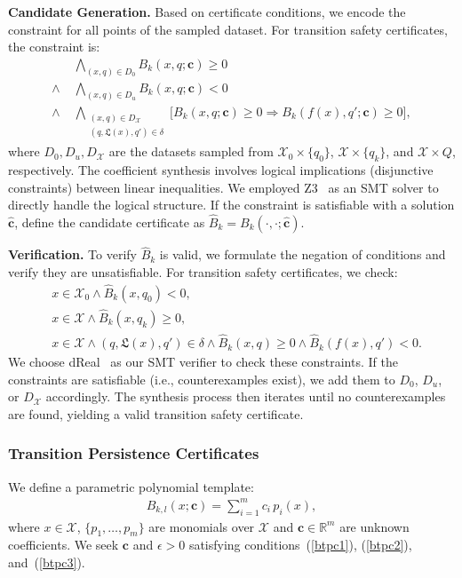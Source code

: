 \textbf{Candidate Generation.} Based on certificate conditions, we encode the constraint for all points of the sampled dataset.
For transition safety certificates, the constraint is:
\begin{align}
  &\bigwedge_{(x,q) \in D_0} B_k(x, q; \mathbf{c}) \geq 0 \label{smt:init} \\ 
  \wedge \; &\bigwedge_{(x,q) \in D_u} B_k(x, q; \mathbf{c}) < 0 \label{smt:unsafe} \\ 
  \wedge \; &\bigwedge_{\substack{(x,q) \in D_{\mathcal{X}} \\ (q, \mathfrak{L}(x), q') \in \delta}} \big[ B_k(x, q; \mathbf{c}) \geq 0 \Rightarrow B_k(f(x), q'; \mathbf{c}) \geq 0 \big], \label{smt:inv}
\end{align}
where $D_0, D_u, D_{\mathcal{X}}$ are the datasets sampled from $\mathcal{X}_0 \times \{q_0\}$, $\mathcal{X} \times \{q_k\}$, and $\mathcal{X} \times Q$, respectively. The coefficient synthesis involves logical implications (disjunctive constraints) between linear inequalities. We employed Z3~\cite{de2008z3} as an SMT solver to directly handle the logical structure. If the constraint is satisfiable with a solution $\hat{\mathbf{c}}$, define the candidate certificate as $\hat{B}_k = B_k(\cdot, \cdot; \hat{\mathbf{c}})$.

\textbf{Verification.} To verify $\hat{B}_k$ is valid, we formulate the negation of conditions and
verify they are unsatisfiable. For transition safety certificates, we check:
\begin{align}
  & x \in \mathcal{X}_0 \land \hat{B}_k(x, q_0) < 0, \label{smt:cex-init} \\ 
  & x \in \mathcal{X} \land \hat{B}_k(x, q_k) \geq 0, \label{smt:cex-unsafe}  \\ 
  & x \in \mathcal{X} \land (q, \mathfrak{L}(x), q') \in \delta \land \hat{B}_k(x, q) \geq 0 \land \hat{B}_k(f(x), q') < 0. \label{smt:cex-inv}
\end{align}
We choose dReal~\cite{gao2013dreal} as our SMT verifier to check these constraints. If the constraints are satisfiable (i.e., counterexamples exist), we add them to $D_0$, $D_u$, or $D_{\mathcal{X}}$ accordingly. The synthesis process then iterates until no counterexamples are found, yielding a valid transition safety certificate.

\subsubsection{Transition Persistence Certificates} 
We define a parametric polynomial template:
\begin{align}
B_{k,l}(x; \mathbf{c}) = \sum_{i=1}^{m} c_i \, p_i(x),
\end{align}
where $x \in \mathcal{X}$, $\{p_1, \ldots, p_{m}\}$ are monomials over $\mathcal{X}$ and $\mathbf{c} \in \mathbb{R}^{m}$ are unknown coefficients. We seek $\mathbf{c}$ and $\epsilon > 0$ satisfying conditions~(\ref{btpc1}), (\ref{btpc2}), and~(\ref{btpc3}). 


